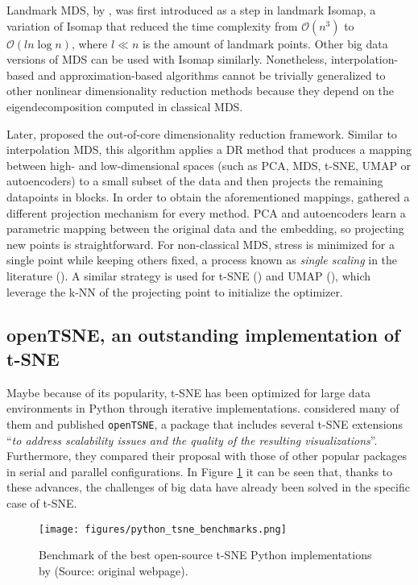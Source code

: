 Landmark MDS, by \citet{Silva2002}, was first introduced as a step in landmark Isomap, a variation of Isomap that reduced the time complexity from $\mathcal{O}(n^3)$ to $\mathcal{O}(ln\log n)$, where $l \ll n$ is the amount of landmark points. Other big data versions of MDS can be used with Isomap similarly. Nonetheless, interpolation-based and approximation-based algorithms cannot be trivially generalized to other nonlinear dimensionality reduction methods because they depend on the eigendecomposition computed in classical MDS.

Later, \citet{Reichmann2024} proposed the out-of-core dimensionality reduction framework. Similar to interpolation MDS, this algorithm applies a DR method that produces a mapping between high- and low-dimensional spaces (such as PCA, MDS, t-SNE, UMAP or autoencoders) to a small subset of the data and then projects the remaining datapoints in blocks. In order to obtain the aforementioned mappings, \citet{Reichmann2024} gathered a different projection mechanism for every method. PCA and autoencoders learn a parametric mapping between the original data and the embedding, so projecting new points is straightforward. For non-classical MDS, stress is minimized for a single point while keeping others fixed, a process known as \textit{single scaling} in the literature (\cite{Basalaj1999}). A similar strategy is used for t-SNE (\cite{Zhang2021}) and UMAP (\cite{McInnes2018a}), which leverage the k-NN of the projecting point to initialize the optimizer.

\subsection{openTSNE, an outstanding implementation of t-SNE}
\label{sec:openTSNE}

Maybe because of its popularity, t-SNE has been optimized for large data environments in Python through iterative implementations. \citet{Policar2024} considered many of them and published \verb|openTSNE|, a package that includes several t-SNE extensions \enquote{\textit{to address scalability issues and the quality of the resulting visualizations}}. Furthermore, they compared their proposal with those of other popular packages in serial and parallel configurations. In Figure \ref{fig:python_tsne_benchmarks} it can be seen that, thanks to these advances, the challenges of big data have already been solved in the specific case of t-SNE.

\begin{figure}
    \centering
    \texttt{[image: figures/python\_tsne\_benchmarks.png]}
    \caption{Benchmark of the best open-source t-SNE Python implementations by \citet{Poličar2023} (Source: original webpage).}
    \label{fig:python_tsne_benchmarks}
\end{figure}